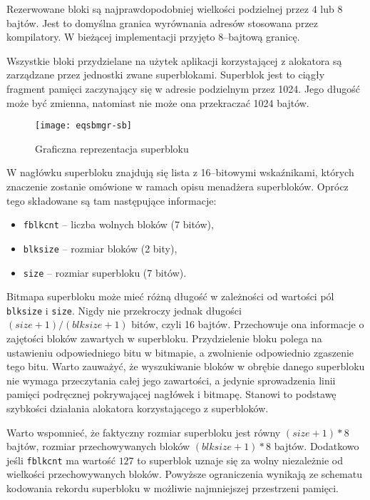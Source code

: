 \documentclass[12pt,a4paper,titlepage,twoside]{mwart}
\begin{document}
Rezerwowane bloki są najprawdopodobniej wielkości podzielnej przez $4$ lub $8$
bajtów. Jest to domyślna granica wyrównania adresów stosowana przez
kompilatory. W bieżącej implementacji przyjęto $8$--bajtową granicę.

Wszystkie bloki przydzielane na użytek aplikacji korzystającej z alokatora są
zarządzane przez jednostki zwane superblokami. Superblok jest to ciągły
fragment pamięci zaczynający się w adresie podzielnym przez 1024. Jego długość
może być zmienna, natomiast nie może ona przekraczać 1024 bajtów.

\begin{figure}[ht]
\centering
\texttt{[image: eqsbmgr-sb]}
\caption{Graficzna reprezentacja superbloku}
\end{figure}

W nagłówku superbloku znajdują się lista z 16--bitowymi wskaźnikami, których
znaczenie zostanie omówione w ramach opisu menadżera superbloków. Oprócz tego
składowane są tam następujące informacje:
\begin{itemize}
\item \texttt{fblkcnt} -- liczba wolnych bloków (7 bitów),
\item \texttt{blksize} -- rozmiar bloków (2 bity),
\item \texttt{size} -- rozmiar superbloku (7 bitów).
\end{itemize}

Bitmapa superbloku może mieć różną długość w zależności od wartości pól
\texttt{blksize} i \texttt{size}. Nigdy nie przekroczy jednak długości $(size +
1) / (blksize + 1)$ bitów, czyli 16 bajtów. Przechowuje ona informacje o
zajętości bloków zawartych w superbloku. Przydzielenie bloku polega na
ustawieniu odpowiedniego bitu w bitmapie, a zwolnienie odpowiednio zgaszenie
tego bitu. Warto zauważyć, że wyszukiwanie bloków w obrębie danego superbloku
nie wymaga przeczytania całej jego zawartości, a jedynie sprowadzenia linii
pamięci podręcznej pokrywającej nagłówek i bitmapę. Stanowi to podstawę
szybkości działania alokatora korzystającego z superbloków.

Warto wspomnieć, że faktyczny rozmiar superbloku jest równy $(size + 1) * 8$
bajtów, rozmiar przechowywanych bloków $(blksize + 1) * 8$ bajtów. Dodatkowo
jeśli \texttt{fblkcnt} ma wartość $127$ to superblok uznaje się za wolny
niezależnie od wielkości przechowywanych bloków. Powyższe ograniczenia wynikają
ze schematu kodowania rekordu superbloku w możliwie najmniejszej przestrzeni
pamięci.
\end{document}
